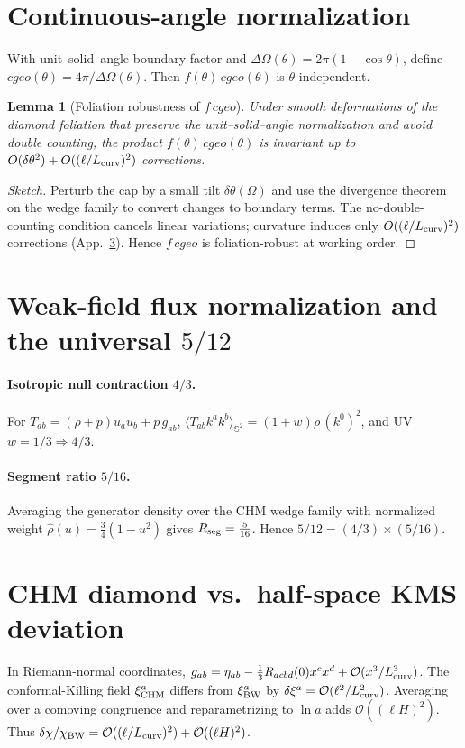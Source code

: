 \documentclass[aps,prd,onecolumn,superscriptaddress,nofootinbib]{revtex4-2}
\def\cgeo{cgeo}%
\def\Omega_\Lambda{OmegaLambda}%
\providecommand{\cgeo}{c_{\rm geo}}
\newtheorem{lemma}{Lemma}
\begin{document}
\section{Continuous-angle normalization}
\label{app:angle}
With unit–solid–angle boundary factor and \(\Delta\Omega(\theta)=2\pi(1-\cos\theta)\), define \(\cgeo(\theta)=4\pi/\Delta\Omega(\theta)\). Then \(f(\theta)\,\cgeo(\theta)\) is \(\theta\)-independent.

\begin{lemma}[Foliation robustness of $f\,\cgeo$]
Under smooth deformations of the diamond foliation that preserve the unit–solid–angle normalization and avoid double counting, the product $f(\theta)\,\cgeo(\theta)$ is invariant up to $O(\delta\theta^2)+O((\ell/L_{\rm curv})^2)$ corrections.
\end{lemma}
\begin{proof}[Sketch]
Perturb the cap by a small tilt $\delta\theta(\Omega)$ and use the divergence theorem on the wedge family to convert changes to boundary terms. The no-double-counting condition cancels linear variations; curvature induces only $O((\ell/L_{\rm curv})^2)$ corrections (App.~\ref{app:chm-kms-estimate}). Hence $f\,\cgeo$ is foliation-robust at working order.
\end{proof}

\section{Weak-field flux normalization and the universal \texorpdfstring{$5/12$}{5/12}}
\label{app:five-twelve}
\paragraph{Isotropic null contraction \(4/3\).} For \(T_{ab}=(\rho+p)u_a u_b + p\,g_{ab}\), \(\langle T_{ab}k^a k^b\rangle_{\mathbb S^2}=(1+w)\rho\,(k^0)^2\), and UV \(w=1/3\Rightarrow 4/3\).
\paragraph{Segment ratio \(5/16\).} Averaging the generator density over the CHM wedge family with normalized weight \(\hat\rho(u)=\tfrac{3}{4}(1-u^2)\) gives \(R_{\rm seg}=\frac{5}{16}\). Hence \(5/12=(4/3)\times(5/16)\).

\section{CHM diamond vs.\ half-space KMS deviation}
\label{app:chm-kms-estimate}
In Riemann-normal coordinates,
\(g_{ab}=\eta_{ab}-\tfrac{1}{3}R_{acbd}(0)x^c x^d+\mathcal O(x^3/L_{\rm curv}^3)\).
The conformal-Killing field \(\xi^a_{\rm CHM}\) differs from \(\xi^a_{\rm BW}\) by \(\delta\xi^a=\mathcal O(\ell^2/L_{\rm curv}^2)\).
Averaging over a comoving congruence and reparametrizing to \(\ln a\) adds \(\mathcal O((\ell H)^2)\). Thus
\(\delta\chi/\chi_{\rm BW}=\mathcal O((\ell/L_{\rm curv})^2)+\mathcal O((\ell H)^2)\).
\end{document}
